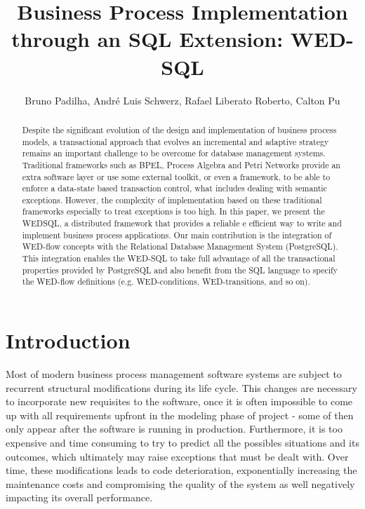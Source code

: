 \documentclass[12pt]{article}
\title{Business Process Implementation through an SQL Extension: WED-SQL}
\author{Bruno Padilha\inst{1}, André Luis Schwerz\inst{2}, Rafael Liberato Roberto\inst{2}, Calton Pu\inst{3}}
\begin{document}
 

\maketitle

\begin{abstract}
  Despite the significant evolution of the design and implementation of business process models, a transactional approach that evolves an incremental and adaptive strategy remains an important challenge to be overcome for database management systems. Traditional frameworks such as BPEL, Process Algebra and Petri Networks provide an extra software layer or use some external toolkit, or even a framework, to be able to enforce a data-state based transaction control, what includes dealing with semantic exceptions. However, the complexity of implementation based on these traditional frameworks especially to treat exceptions is too high. In this paper, we present the WEDSQL, a distributed framework that provides a reliable e efficient way to write and implement business process applications. Our main contribution is the integration of WED-flow concepts with the Relational Database Management System (PostgreSQL). This integration enables the WED-SQL to take full advantage of all the transactional properties provided by PostgreSQL and also benefit from the SQL language to specify the WED-flow definitions (e.g. WED-conditions, WED-transitions, and so on).
\end{abstract}
     
\section{Introduction}

Most of modern business process management software systems are subject to recurrent structural modifications during its
life cycle. This changes are necessary to incorporate new requisites to the software, once it is often impossible 
to come up with all requirements upfront in the modeling phase of project - some of then only appear after the software
is running in production. Furthermore, it is too expensive and time consuming to try to predict all the possibles situations 
and its outcomes, which ultimately may raise exceptions that must be dealt with. Over time, these modifications leads
to code deterioration, exponentially increasing the maintenance costs and compromising the quality of the system as well 
negatively impacting its overall performance.
\end{document}
